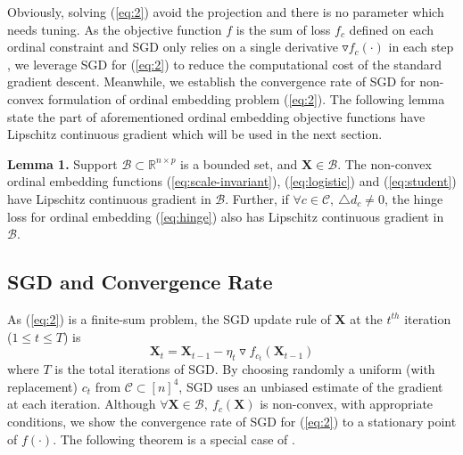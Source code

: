 \documentclass[letterpaper]{article}
\begin{document}
		Obviously, solving (\ref{eq:2}) avoid the projection and there is no parameter which needs tuning. As the objective function $f$ is the sum of loss $f_c$ defined on each ordinal constraint and SGD only relies on a single derivative $\triangledown f_c(\cdot)$ in each step , we leverage SGD for (\ref{eq:2}) to reduce the computational cost of the standard gradient descent. Meanwhile, we establish the convergence rate of SGD for non-convex formulation of ordinal embedding problem (\ref{eq:2}). The following lemma state the part of aforementioned ordinal embedding objective functions have Lipschitz continuous gradient which will be used in the next section.

		\textbf{Lemma 1.} Support $\mathcal{B}\subset\mathbb{R}^{n\times p}$ is a bounded set, and $\mathbf{X}\in\mathcal{B}$. The non-convex ordinal embedding functions (\ref{eq:scale-invariant}), (\ref{eq:logistic}) and (\ref{eq:student}) have Lipschitz continuous gradient in $\mathcal{B}$. Further, if $\forall c\in\mathcal{C},\ \triangle d_c\neq 0$, the hinge loss for ordinal embedding (\ref{eq:hinge}) also has Lipschitz continuous gradient in $\mathcal{B}$.


		\subsection{SGD and Convergence Rate}

		As (\ref{eq:2}) is a finite-sum problem, the SGD update rule of $\mathbf{X}$ at the $t^{th}$ iteration ($1\leq t\leq T$) is
		\begin{equation}
			\label{eq:3}
			\mathbf{X}_{t} = \mathbf{X}_{t-1}-\eta_{t}\triangledown f_{c_t}(\mathbf{X}_{t-1})
		\end{equation}
		where $T$ is the total iterations of SGD. By choosing randomly a uniform (with replacement) $c_t$ from $\mathcal{C}\subset[n]^4$, SGD uses an unbiased estimate of the gradient at each iteration. Although $\forall \mathbf{X}\in\mathcal{B},\ f_c(\mathbf{X})$ is non-convex, with appropriate conditions, we show the convergence rate of SGD for (\ref{eq:2}) to a stationary point of $f(\cdot)$. The following theorem is a special case of \cite{ghadimi2013stochastic}.
		
\end{document}
